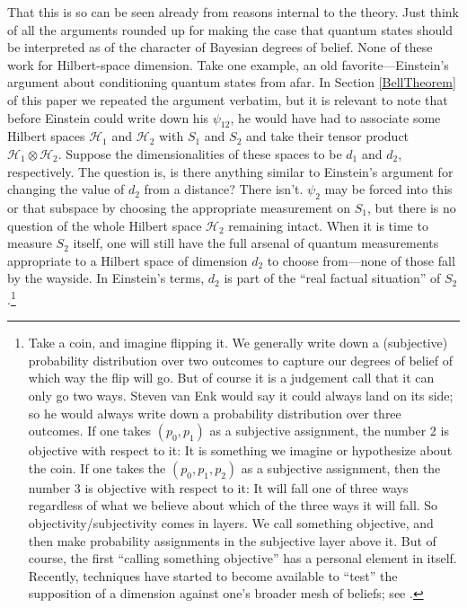\documentclass[aps,pra,superscriptaddress,12pt,tightenlines,nofootinbib]{revtex4-2}
\begin{document}
That this is so can be seen already from reasons internal to the
theory.  Just think of all the arguments rounded up for making the
case that quantum states should be interpreted as of the character of
Bayesian degrees of belief.  None of these work for Hilbert-space
dimension.  Take one example, an old favorite---Einstein's argument
about conditioning quantum states from afar.  In Section
\ref{BellTheorem} of this paper we repeated the argument verbatim, but
it is relevant to note that before Einstein could write down his
$\psi_{12}$, he would have had to associate some Hilbert spaces
${\mathcal H}_1$ and ${\mathcal H}_2$ with $S_1$ and $S_2$ and take
their tensor product ${\mathcal H}_1\otimes{\mathcal H}_2$.  Suppose
the dimensionalities of these spaces to be $d_1$ and $d_2$,
respectively.  The question is, is there anything similar to
Einstein's argument for changing the value of $d_2$ from a distance?
There isn't.  $\psi_2$ may be forced into this or that subspace by
choosing the appropriate measurement on $S_1$, but there is no
question of the whole Hilbert space ${\mathcal H}_2$ remaining intact.
When it is time to measure $S_2$ itself, one will still have the full
arsenal of quantum measurements appropriate to a Hilbert space of
dimension $d_2$ to choose from---none of those fall by the wayside.
In Einstein's terms, $d_2$ is part of the ``real factual situation''
of $S_2$.\footnote{Take a coin, and imagine flipping it. We generally
  write down a (subjective) probability distribution over two
  outcomes to capture our degrees of belief of which way the flip will
  go. But of course it is a judgement call that it can only go two
  ways. Steven van Enk would say it could always land on its side; so
  he would always write down a probability distribution over three
  outcomes.  If one takes $(p_0 , p_1 )$ as a subjective assignment,
  the number 2 is objective with respect to it: It is something we imagine
  or hypothesize about the coin. If one takes the $(p_0, p_1, p_2 )$
  as a subjective assignment, then the number 3 is objective with
  respect to it: It will fall one of three ways regardless of what we
  believe about which of the three ways it will fall. So
  objectivity/subjectivity comes in layers. We call something
  objective, and then make probability assignments in the subjective
  layer above it. But of course, the first ``calling something
  objective'' has a personal element in itself.  Recently, techniques
  have started to become available to ``test'' the supposition of a
  dimension against one's broader mesh of beliefs; see
  \cite{Brunner08,Wehner08,Wolf09}.}
\end{document}

